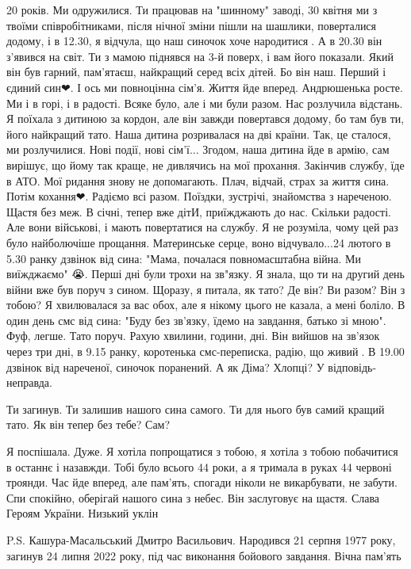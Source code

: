20 років. Ми одружилися. Ти працював на "шинному" заводі, 30 квітня ми з
твоїми співробітниками, після нічної зміни пішли на шашлики, поверталися
додому, і в 12.30, я відчула, що наш синочок хоче народитися🥰. А в 20.30 він
з'явився на світ. Ти з мамою піднявся на 3-й поверх, і вам його показали. Який
він був гарний, пам'ятаєш, найкращий серед всіх дітей. Бо він наш. Перший і
єдиний син❤. І ось ми повноцінна  сім'я. Життя йде вперед. Андрюшенька росте.
Ми і в горі, і в радості. Всяке було, але і ми були разом.  Нас розлучила
відстань. Я поїхала з дитиною за кордон, але він завжди повертався додому, бо
там був ти, його найкращий тато. Наша дитина розривалася на дві країни. Так,
це сталося, ми розлучилися. Нові події, нові сім'ї... Згодом, наша дитина йде
в армію, сам вирішує, що йому так краще, не дивлячись на мої прохання.
Закінчив службу, їде в АТО. Мої ридання знову не допомагають. Плач, відчай,
страх за життя сина. Потім кохання❤. Радіємо всі разом. Поїздки, зустрічі,
знайомства з нареченою. Щастя без меж. В січні, тепер вже дітИ, приїжджають до
нас. Скільки радості. Але вони військові, і мають повертатися на службу. Я не
розуміла, чому цей раз було найболючіше прощання. Материнське серце, воно
відчувало...24 лютого в 5.30 ранку дзвінок від сина:  "Мама, почалася
повномасштабна війна. Ми виїжджаємо" 😭. Перші дні були трохи на зв"язку. Я
знала, що ти на другий день війни вже був поруч з сином. Щоразу, я питала, як
тато? Де він? Ви разом? Він з тобою? Я хвилювалася за вас обох, але я нікому
цього не казала, а мені боліло. В один день смс від сина: "Буду без зв'язку,
їдемо на завдання, батько зі мною". Фуф, легше. Тато поруч. Рахую хвилини,
години, дні. Він вийшов на зв'язок через три дні, в 9.15 ранку,  коротенька
смс-переписка, радію, що живий🙏. В 19.00 дзвінок від нареченої, синочок
поранений. А як Діма? Хлопці? У відповідь-неправда. 

Ти загинув. Ти залишив нашого сина самого. Ти для нього був самий кращий тато.
Як він тепер без тебе? Сам?

Я поспішала. Дуже. Я хотіла попрощатися з тобою, я хотіла з тобою побачитися
в останнє і назавжди. Тобі було всього 44 роки, а я тримала в руках 44
червоні троянди. Час йде вперед,  але пам'ять, спогади ніколи не викарбувати,
не забути. Спи спокійно, оберігай нашого сина з небес. Він заслуговує на
щастя. Слава Героям України. Низький уклін

P.S. Кашура-Масальський Дмитро Васильович. Народився 21 серпня 1977 року,
загинув 24 липня 2022 року, під час виконання бойового завдання. Вічна
пам'ять🙏



